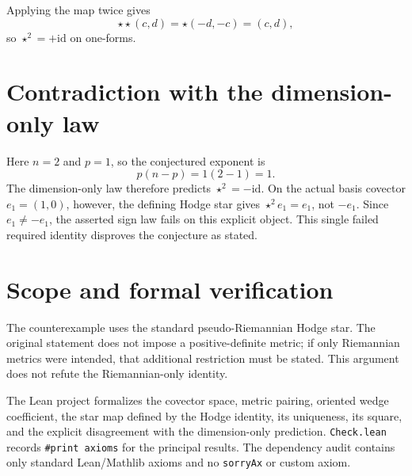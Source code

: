 \documentclass[11pt]{article}
\begin{document}
Applying the map twice gives
\[
  \star\star(c,d)=\star(-d,-c)=(c,d),
\]
so $\star^2=+\mathrm{id}$ on one-forms.

\section*{Contradiction with the dimension-only law}

Here $n=2$ and $p=1$, so the conjectured exponent is
\[
  p(n-p)=1(2-1)=1.
\]
The dimension-only law therefore predicts $\star^2=-\mathrm{id}$. On the actual basis covector $e_1=(1,0)$, however, the defining Hodge star gives $\star^2e_1=e_1$, not $-e_1$. Since $e_1\ne -e_1$, the asserted sign law fails on this explicit object. This single failed required identity disproves the conjecture as stated.

\section*{Scope and formal verification}

The counterexample uses the standard pseudo-Riemannian Hodge star. The original statement does not impose a positive-definite metric; if only Riemannian metrics were intended, that additional restriction must be stated. This argument does not refute the Riemannian-only identity.

The Lean project formalizes the covector space, metric pairing, oriented wedge coefficient, the star map defined by the Hodge identity, its uniqueness, its square, and the explicit disagreement with the dimension-only prediction. \texttt{Check.lean} records \texttt{\#print axioms} for the principal results. The dependency audit contains only standard Lean/Mathlib axioms and no \texttt{sorryAx} or custom axiom.
\end{document}
